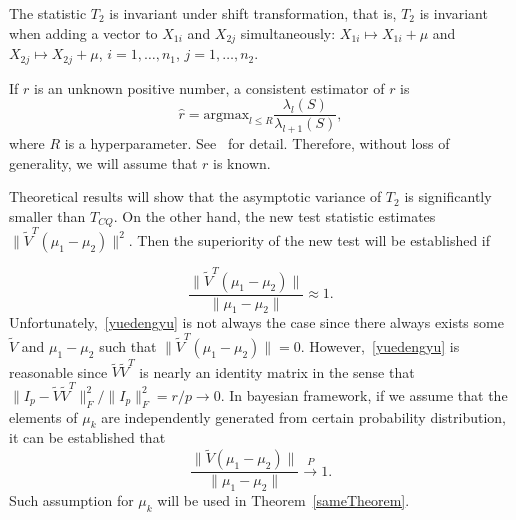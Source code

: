 \begin{remark} The statistic $T_2$ is invariant under shift transformation, that is, $T_2$ is invariant when adding a vector to $X_{1i}$ and $X_{2j}$ simultaneously: $X_{1i}\mapsto X_{1i}+\mu$ and $X_{2j}\mapsto X_{2j}+\mu$, $i=1,\ldots,n_1$, $j=1,\ldots,n_2$.
\end{remark}


\begin{remark}
If $r$ is an unknown positive number, a consistent estimator of $r$ is
\begin{equation}\label{estimateR}
    \hat{r}=\textrm{argmax}_{l\leq R}\frac{\lambda_l(S)}{\lambda_{l+1}(S)},
\end{equation}
where $R$ is a hyperparameter. See~\cite{Ahn2009Eigenvalue} for detail. Therefore, without loss of generality, we will assume that $r$ is known.
\end{remark}

    Theoretical results will show that the asymptotic variance of $T_2$ is significantly smaller than $T_{CQ}$. 
    On the other hand, the new test statistic estimates $\|\tilde{V}^T(\mu_1-\mu_2)\|^2$.
    Then the superiority of the new test will be established if 
    
\begin{equation}\label{yuedengyu}
    \frac{\|\tilde{V}^T(\mu_1-\mu_2)\|}{\|\mu_1-\mu_2\|}\approx 1.
\end{equation}
Unfortunately,~\eqref{yuedengyu}
is not always the case since there always exists some
$\tilde{V}$ and $\mu_1-\mu_2$ such that $\|\tilde{V}^T(\mu_1-\mu_2)\|=0$.
However,~\eqref{yuedengyu} is reasonable since $\tilde{V}\tilde{V}^T$ is nearly an identity matrix in the sense that
    ${\|I_p-\tilde{V}\tilde{V}^T\|_F^2}/{\|I_p\|_F^2}=r/p\to 0$. 
In bayesian framework, if we assume that the elements of $\mu_k$ are independently generated from certain probability distribution, it can be established that 
\begin{equation*}
    \frac{\|\tilde{V}(\mu_1-\mu_2)\|}{\|\mu_1-\mu_2\|}\xrightarrow{P}1.
\end{equation*}
Such assumption for $\mu_k$ will be used in Theorem~\ref{sameTheorem}.






